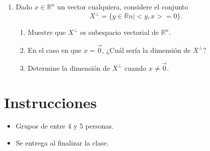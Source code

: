 \documentclass[12pt]{article}
\newcommand{\R}{\mathbb{R}}
\theoremstyle{exampstyle}
\theoremstyle{definition}
\theoremstyle{break}
\numberwithin{equation}{section}
\begin{document}
\begin{enumerate}
\item Dado $x \in \R^{n}$ un vector cualquiera, considere el conjunto
$$X^{\bot} = \{ y \in \R{n} | < y,x >=0 \}. $$
\begin{enumerate}
    \item Muestre que $X^{\bot}$ es subespacio vectorial de $\R^{n}$.
    \item En el caso en que $x= \Vec{0}$, ¿Cuál sería la dimensión de $X^{\bot}$?
    \item Determine la dimensión de $X^{\bot}$ cuando $x \neq \Vec{0}$.
\end{enumerate}
 


\end{enumerate}
\section*{Instrucciones}
\begin{itemize}
    \item Grupos de entre 4 y 5 personas.
    \item Se entrega al finalizar la clase.
\end{itemize}
\end{document}
